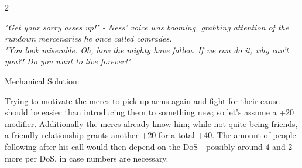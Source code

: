 \begin{multicols}{2}
	\begin{exampleblock}
		\itshape
		"Get your sorry asses up!"
			- Ness' voice was booming,
			grabbing attention of the rundown mercenaries he once called comrades.
		\\%
		"You look miserable. Oh, how the mighty have fallen.
		If we can do it, why can't you?!
		Do you want to live forever!"
	\end{exampleblock}
	\columnbreak
	\ul{Mechanical Solution:}
	\begin{exampleblock}
		Trying to motivate the mercs to pick up arms again and fight for their cause should be easier than introducing them to something new; so let's assume a +20 modifier. Additionally the mercs already know him; while not quite being friends, a friendly relationship grants another +20 for a total +40. The amount of people following after his call would then depend on the DoS - possibly around 4 and 2 more per DoS, in case numbers are necessary.
	\end{exampleblock}
\end{multicols}
